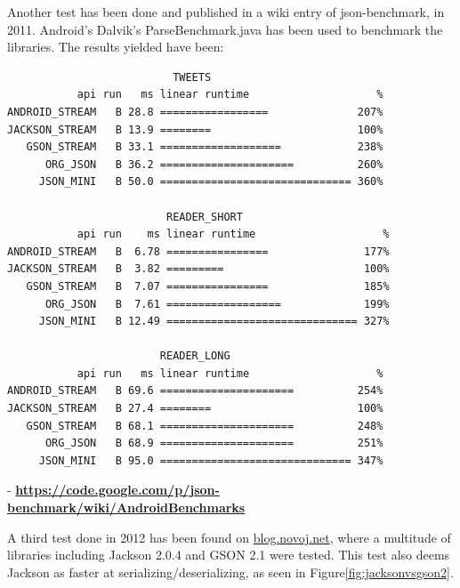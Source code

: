 \documentclass{article}
\begin{document}
\begin{enumerate}
  Another test has been done and published in a wiki entry of json-benchmark,
  in 2011. Android's Dalvik's ParseBenchmark.java has been used to benchmark
  the libraries. The results yielded have been:\newline
  \begin{verbatim}
                          TWEETS                              
           api run   ms linear runtime                    % 
ANDROID_STREAM   B 28.8 =================              207% 
JACKSON_STREAM   B 13.9 ========                       100% 
   GSON_STREAM   B 33.1 ===================            238% 
      ORG_JSON   B 36.2 =====================          260% 
     JSON_MINI   B 50.0 ============================== 360% 

                         READER_SHORT                        
           api run    ms linear runtime                    % 
ANDROID_STREAM   B  6.78 ================               177% 
JACKSON_STREAM   B  3.82 =========                      100% 
   GSON_STREAM   B  7.07 ================               185% 
      ORG_JSON   B  7.61 ==================             199% 
     JSON_MINI   B 12.49 ============================== 327% 

                        READER_LONG                         
           api run   ms linear runtime                    % 
ANDROID_STREAM   B 69.6 =====================          254% 
JACKSON_STREAM   B 27.4 ========                       100% 
   GSON_STREAM   B 68.1 =====================          248% 
      ORG_JSON   B 68.9 =====================          251% 
     JSON_MINI   B 95.0 ============================== 347% 
  \end{verbatim}  -
  \textbf{\url{https://code.google.com/p/json-benchmark/wiki/AndroidBenchmarks}}\newline
   
  A third test done in 2012 has been found on \url{blog.novoj.net}, where a
  multitude of libraries including Jackson 2.0.4 and GSON 2.1 were tested. This
  test also deems Jackson as faster at serializing/deserializing, as seen in
  Figure\ref{fig:jacksonvsgson2}.\newline
  

\end{enumerate}
\end{document}
